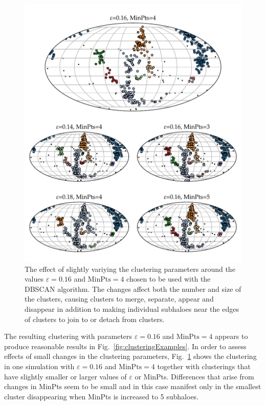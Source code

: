 \documentclass[english, oneside]{HYgradu}
\begin{document}
\begin{figure}
    \centering
    \includegraphics{kuvat/smallClusteringVariations.pdf}
    \caption{The effect of slightly variying the clustering parameters around the values $\varepsilon=0.16$ and $\mathrm{MinPts}=4$ chosen to be used with the DBSCAN algorithm. The changes affect both the number and size of the clusters, causing clusters to merge, separate, appear and disappear in addition to making individual subhaloes near the edges of clusters to join to or detach from clusters.}\label{fig:clusteringvariations}
\end{figure}

The resulting clustering with parameters $\varepsilon=0.16$ and $\mathrm{MinPts}=4$ appears to produce reasonable results in Fig.~\ref{fig:clusteringExamples}. In order to assess effects of small changes in the clustering parameters, Fig.~\ref{fig:clusteringvariations} shows the clustering in one simulation with $\varepsilon=0.16$ and $\mathrm{MinPts}=4$ together with clusterings that have slightly smaller or larger values of $\varepsilon$ or MinPts. Differences that arise from changes in MinPts seem to be small and in this case manifest only in the smallest cluster disappearing when MinPts is increased to 5 subhaloes.
\end{document}
